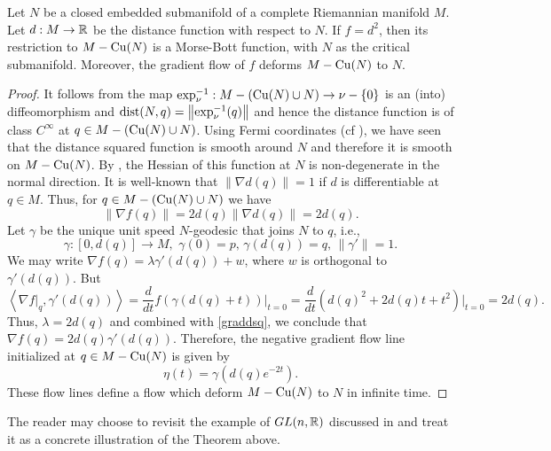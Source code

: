 \begin{thm}\label{thm: Morse-Bott}
    Let $N$ be a closed embedded submanifold of a complete Riemannian manifold $M$. Let $d:M\to\mathbb{R}$ be the distance function with respect to $N$. If $f=d^2$, then its restriction to $M-\mathrm{Cu}(N)$ is a Morse-Bott function, with $N$ as the critical submanifold. Moreover, the gradient flow of $f$ deforms $M-\mathrm{Cu}(N)$ to $N$.
\end{thm}
\begin{proof}
    It follows from  the map $\exp_\nu^{-1}:M - \left( \mathrm{Cu}(N) \cup N \right)\to \nu - \{0\}$ is an (into) diffeomorphism and $\operatorname{dist}(N,q) = \left\|\exp^{-1}_\nu(q)\right\|$ and hence the distance function is of class $C^{\infty}$ at $q\in M - \left( \mathrm{Cu}(N)\cup N \right)$. Using Fermi coordinates (cf ), we have seen that the distance squared function is smooth around $N$ and therefore it is smooth on $M - \mathrm{Cu}(N)$. By , the Hessian of this function at $N$ is non-degenerate in the normal direction. It is well-known \cite[Proposition 4.8]{Sak96} that $\|\nabla d(q)\|=1$ if $d$ is differentiable at $q\in M$. Thus, for $q\in M-(\mathrm{Cu}(N)\cup N)$ we have
    \begin{equation}\label{graddsq}
        \|\nabla f(q)\|=2d(q)\|\nabla d(q)\|=2d(q).
    \end{equation}
    Let $\gamma$ be the unique unit speed $N$-geodesic that joins $N$ to $q$, i.e., 
    \begin{displaymath}
        \gamma:[0,d(q)]\to M,\,\,\gamma(0)=p,\,\gamma(d(q))=q,\,\|\gamma'\|=1.
    \end{displaymath}
    We may write $\nabla f(q)=\lambda \gamma'(d(q))+w$, where $w$ is orthogonal to $\gamma'(d(q))$. But 
    \begin{displaymath}
        \left\langle \nabla f\big|_q, \gamma'(d(q))\right\rangle = \frac{d}{dt}f(\gamma(d(q)+t))\Big|_{t=0}=\frac{d}{dt}(d(q)^2+2d(q)t+t^2)\Big|_{t=0}=2d(q).
    \end{displaymath}
    Thus, $\lambda=2d(q)$ and combined with \eqref{graddsq}, we conclude that $\nabla f(q)=2d(q)\gamma'(d(q))$. Therefore, the negative gradient flow line initialized at $q\in M-\mathrm{Cu}(N)$ is given by
    \begin{displaymath}
        \eta(t)=\gamma(d(q)e^{-2t}).
    \end{displaymath}
    These flow lines define a flow which deform $M-\mathrm{Cu}(N)$ to $N$ in infinite time. 
\end{proof}

\vspace{0.3cm}
\hf The reader may choose to revisit the example of $GL(n,\mathbb{R})$ discussed in  and treat it as a concrete illustration of the Theorem above.